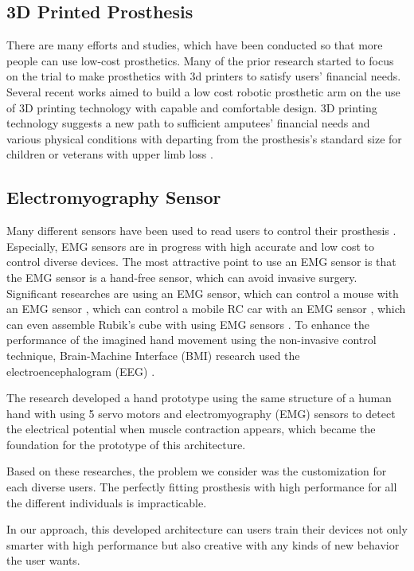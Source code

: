 \documentclass[conference]{IEEEtran}
\begin{document}
\subsection{3D Printed Prosthesis}
There are many efforts and studies, which have been conducted so that more people can use low-cost prosthetics. Many of the prior research started to focus on the trial to make prosthetics with 3d printers to satisfy users' financial needs. Several recent works \cite{3D2}\cite{3D4} aimed to build a low cost robotic prosthetic arm on the use of 3D printing technology with capable and comfortable design. 3D printing technology suggests a new path to sufficient amputees' financial needs and various physical conditions with departing from the prosthesis's standard size for children or veterans with upper limb loss \cite{3D3}.

\subsection{Electromyography Sensor}
Many different sensors have been used to read users to control their prosthesis \cite{MMG}. Especially, EMG sensors are in progress with high accurate and low cost to control diverse devices. The most attractive point to use an EMG sensor is that the EMG sensor is a hand-free sensor, which can avoid invasive surgery. Significant researches are using an EMG sensor, which can control a mouse with an EMG sensor \cite{mouse}, which can control a mobile RC car with an EMG sensor \cite{RCcar}, which can even assemble Rubik's cube \cite{rubikcube} with using EMG sensors \cite{controlEMG}. To enhance the performance of the imagined hand movement using the non-invasive control technique, Brain-Machine Interface (BMI) research used the electroencephalogram (EEG) \cite{EEG}.

The research \cite{3D1} developed a hand prototype using the same structure of a human hand with using 5 servo motors and electromyography (EMG) sensors to detect the electrical potential when muscle contraction appears, which became the foundation for the prototype of this architecture.




Based on these researches, the problem we consider was the customization for each diverse users. The perfectly fitting prosthesis with high performance for all the different individuals is impracticable.

In our approach, this developed architecture can users train their devices not only smarter with high performance but also creative with any kinds of new behavior the user wants.
\end{document}
